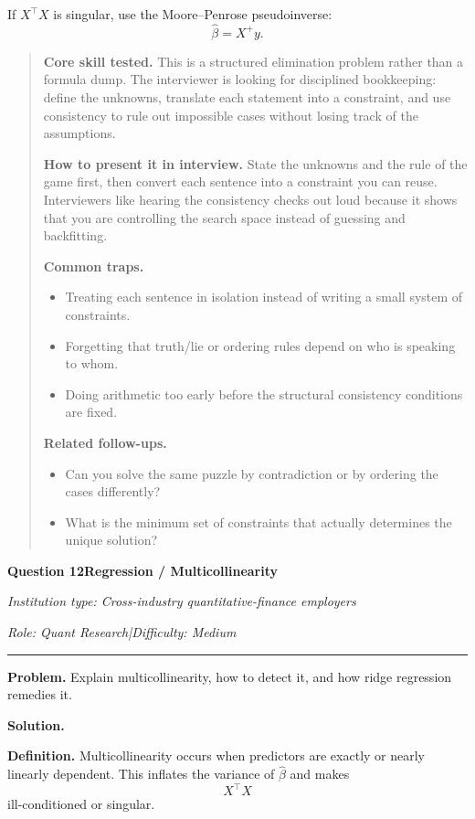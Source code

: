 \documentclass[11pt,letterpaper,openany]{book}
\newenvironment{EditorialNote}
  {\begin{quote}\small\setlength{\parskip}{0.25em}}
  {\end{quote}}
\newcommand{\QuestionSpacer}{\vspace{0.4em}}
\newcommand{\InterviewQuestionHeader}[5]{%
  \vspace{1.0em}%
  {\large\bfseries #1\enspace #4\par}%
  {\small\itshape Institution type: #2\par}%
  {\small\itshape Role: #3\enspace |\enspace Difficulty: #5\par}%
  \vspace{0.25em}\hrule\vspace{0.45em}%
}
\begin{document}
If \(X^\top X\) is singular, use the Moore--Penrose pseudoinverse:
\[
\hat{\beta}=X^+ y.
\]

\begin{EditorialNote}


\textbf{Core skill tested.} This is a structured elimination problem rather than a formula dump. The interviewer is looking for disciplined bookkeeping: define the unknowns, translate each statement into a constraint, and use consistency to rule out impossible cases without losing track of the assumptions.

\textbf{How to present it in interview.} State the unknowns and the rule of the game first, then convert each sentence into a constraint you can reuse. Interviewers like hearing the consistency checks out loud because it shows that you are controlling the search space instead of guessing and backfitting.

\textbf{Common traps.}
\begin{itemize}
\item Treating each sentence in isolation instead of writing a small system of constraints.
\item Forgetting that truth/lie or ordering rules depend on who is speaking to whom.
\item Doing arithmetic too early before the structural consistency conditions are fixed.
\end{itemize}

\textbf{Related follow-ups.}
\begin{itemize}
\item Can you solve the same puzzle by contradiction or by ordering the cases differently?
\item What is the minimum set of constraints that actually determines the unique solution?
\end{itemize}


\end{EditorialNote}
\QuestionSpacer

\InterviewQuestionHeader{Question 12}{Cross-industry quantitative-finance employers}{Quant Research}{Regression / Multicollinearity}{Medium}
\textbf{Problem.} Explain multicollinearity, how to detect it, and how ridge regression remedies it.

\textbf{Solution.}

\textbf{Definition.} Multicollinearity occurs when predictors are exactly or nearly linearly dependent. This inflates the variance of \(\hat{\beta}\) and makes
\[
X^\top X
\]
ill-conditioned or singular.
\end{document}
